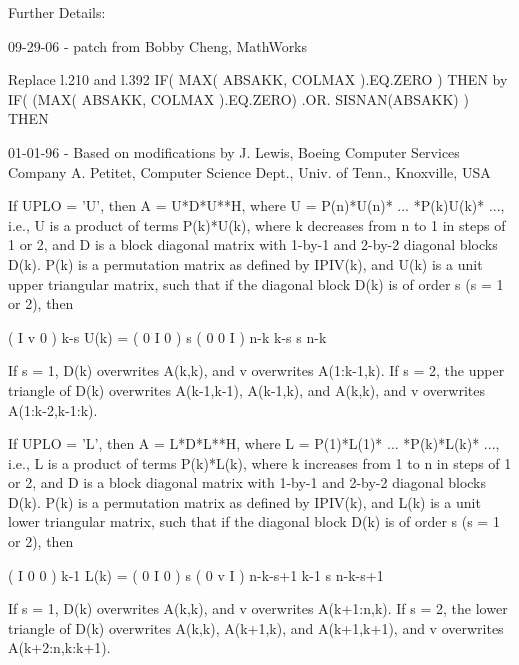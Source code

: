 \begin{DoxyParagraph}{Further Details\+: }
\begin{DoxyVerb}  09-29-06 - patch from
    Bobby Cheng, MathWorks

    Replace l.210 and l.392
         IF( MAX( ABSAKK, COLMAX ).EQ.ZERO ) THEN
    by
         IF( (MAX( ABSAKK, COLMAX ).EQ.ZERO) .OR. SISNAN(ABSAKK) ) THEN

  01-01-96 - Based on modifications by
    J. Lewis, Boeing Computer Services Company
    A. Petitet, Computer Science Dept., Univ. of Tenn., Knoxville, USA

  If UPLO = 'U', then A = U*D*U**H, where
     U = P(n)*U(n)* ... *P(k)U(k)* ...,
  i.e., U is a product of terms P(k)*U(k), where k decreases from n to
  1 in steps of 1 or 2, and D is a block diagonal matrix with 1-by-1
  and 2-by-2 diagonal blocks D(k).  P(k) is a permutation matrix as
  defined by IPIV(k), and U(k) is a unit upper triangular matrix, such
  that if the diagonal block D(k) is of order s (s = 1 or 2), then

             (   I    v    0   )   k-s
     U(k) =  (   0    I    0   )   s
             (   0    0    I   )   n-k
                k-s   s   n-k

  If s = 1, D(k) overwrites A(k,k), and v overwrites A(1:k-1,k).
  If s = 2, the upper triangle of D(k) overwrites A(k-1,k-1), A(k-1,k),
  and A(k,k), and v overwrites A(1:k-2,k-1:k).

  If UPLO = 'L', then A = L*D*L**H, where
     L = P(1)*L(1)* ... *P(k)*L(k)* ...,
  i.e., L is a product of terms P(k)*L(k), where k increases from 1 to
  n in steps of 1 or 2, and D is a block diagonal matrix with 1-by-1
  and 2-by-2 diagonal blocks D(k).  P(k) is a permutation matrix as
  defined by IPIV(k), and L(k) is a unit lower triangular matrix, such
  that if the diagonal block D(k) is of order s (s = 1 or 2), then

             (   I    0     0   )  k-1
     L(k) =  (   0    I     0   )  s
             (   0    v     I   )  n-k-s+1
                k-1   s  n-k-s+1

  If s = 1, D(k) overwrites A(k,k), and v overwrites A(k+1:n,k).
  If s = 2, the lower triangle of D(k) overwrites A(k,k), A(k+1,k),
  and A(k+1,k+1), and v overwrites A(k+2:n,k:k+1).\end{DoxyVerb}
 
\end{DoxyParagraph}
